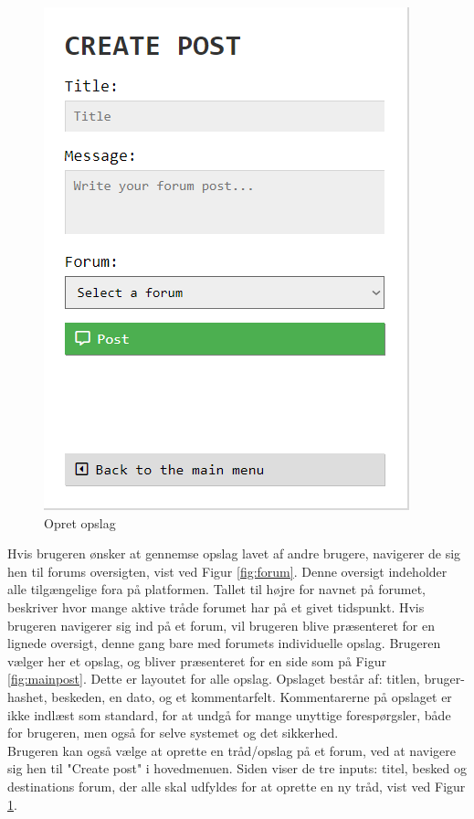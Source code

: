 \begin{table}[H]
\begin{minipage}{.33\textwidth}
\begin{figure}[H]
            \includegraphics[width=0.95\linewidth]{Projectdoc/Assets/Illustrationer/send.png}
            \caption{Opret opslag}
            \label{fig:sendpost}
        \end{figure}
    \end{minipage}
\end{table}

Hvis brugeren ønsker at gennemse opslag lavet af andre brugere, navigerer de sig hen til forums oversigten, vist ved Figur \ref{fig:forum}. Denne oversigt indeholder alle tilgængelige fora på platformen. Tallet til højre for navnet på forumet, beskriver hvor mange aktive tråde forumet har på et givet tidspunkt. Hvis brugeren navigerer sig ind på et forum, vil brugeren blive præsenteret for en lignede oversigt, denne gang bare med forumets individuelle opslag. Brugeren vælger her et opslag, og bliver præsenteret for en side som på Figur \ref{fig:mainpost}. Dette er layoutet for alle opslag. Opslaget består af: titlen, bruger-hashet, beskeden, en dato, og et kommentarfelt. Kommentarerne på opslaget er ikke indlæst som standard, for at undgå for mange unyttige forespørgsler, både for brugeren, men også for selve systemet og det sikkerhed.\\
Brugeren kan også vælge at oprette en tråd/opslag på et forum, ved at navigere sig hen til "Create post" i hovedmenuen. Siden viser de tre inputs: titel, besked og destinations forum, der alle skal udfyldes for at oprette en ny tråd, vist ved Figur \ref{fig:sendpost}.